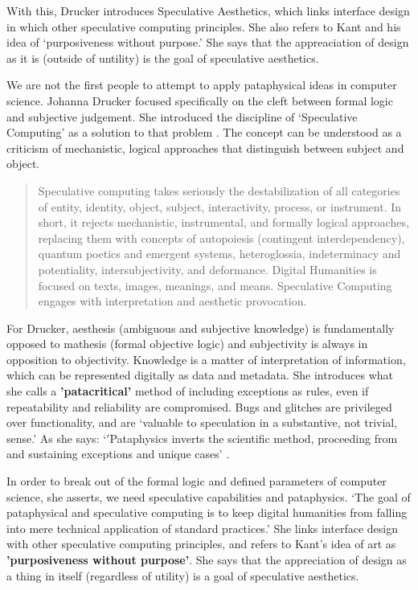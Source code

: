With this, Drucker introduces Speculative Aesthetics, which links interface design in which other speculative computing principles. She also refers to Kant and his idea of `purposiveness without purpose.' She says that the appreaciation of design as it is (outside of untility) is the goal of speculative aesthetics.

We are not the first people to attempt to apply pataphysical ideas in computer science. Johanna Drucker focused specifically on the cleft between formal logic and subjective judgement. She introduced the discipline of `Speculative Computing' as a solution to that problem \autocite{Drucker2007}. The concept can be understood as a criticism of mechanistic, logical approaches that distinguish between subject and object.

\begin{quotation}
  Speculative computing takes seriously the destabilization of all categories of entity, identity, object, subject, interactivity, process, or instrument. In short, it rejects mechanistic, instrumental, and formally logical approaches, replacing them with concepts of autopoiesis (contingent interdependency), quantum poetics and emergent systems, heteroglossia, indeterminacy and potentiality, intersubjectivity, and deformance. Digital Humanities is focused on texts, images, meanings, and means. Speculative Computing engages with interpretation and aesthetic provocation. 
\end{quotation}

For Drucker, aesthesis (ambiguous and subjective knowledge) is fundamentally opposed to mathesis (formal objective logic) and subjectivity is always in opposition to objectivity. Knowledge is a matter of interpretation of information, which can be represented digitally as data and metadata. She introduces what she calls a \textbf{'patacritical'} method of including exceptions as rules, even if repeatability and reliability are compromised. Bugs and glitches are privileged over functionality, and are `valuable to speculation in a substantive, not trivial, sense.' As she says: `$'$Pataphysics inverts the scientific method, proceeding from and sustaining exceptions and unique cases' \autocite{Drucker2007}.

In order to break out of the formal logic and defined parameters of computer science, she asserts, we need speculative capabilities and pataphysics. `The goal of pataphysical and speculative computing is to keep digital humanities from falling into mere technical application of standard practices.' She links interface design with other speculative computing principles, and refers to Kant's idea of art as \textbf{'purposiveness without purpose'}. She says that the appreciation of design as a thing in itself (regardless of utility) is a goal of speculative aesthetics.

